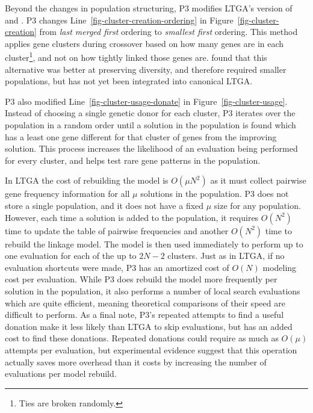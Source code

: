 \documentclass[twoside]{article}
\begin{document}
Beyond the changes in population structuring, P3 modifies
LTGA's version of  and .
P3 changes Line~\ref{fig-cluster-creation-ordering} in Figure~\ref{fig-cluster-creation}
from \emph{last merged first} ordering to \emph{smallest first} ordering.
This method applies gene clusters during crossover based on how many genes
are in each cluster\footnote{Ties are broken randomly.}, and not on how tightly linked those genes are.
\cite{goldman:2012:ltga} found that this alternative was better at preserving
diversity, and therefore required smaller populations, but has not yet been integrated into
canonical LTGA.

P3 also modified Line~\ref{fig-cluster-usage-donate} in Figure~\ref{fig-cluster-usage}.
Instead of choosing a single genetic donor for each cluster, P3 iterates over the
population in a random order until a solution in the population is found which
has a least one gene different for that cluster of genes from the improving solution.
This process increases the likelihood of an evaluation being performed for every cluster,
and helps test rare gene patterns in the population.

In LTGA the cost of rebuilding the model is $O(\mu N^2)$ as it must collect pairwise
gene frequency information for all $\mu$ solutions in the population. P3 does not store
a single population, and it does not have a fixed $\mu$ size for any population. However,
each time a solution is added to the population, it requires $O(N^2)$ time to update
the table of pairwise frequencies and another $O(N^2)$ time to rebuild the linkage model.
The model is then used immediately to perform up to one evaluation for each of the up
to $2N-2$ clusters. Just as in LTGA, if no evaluation shortcuts were made, P3
has an amortized cost of $O(N)$ modeling cost per evaluation. While P3 does
rebuild the model more frequently per solution in the population, it also performs
a number of local search evaluations which are quite efficient, meaning theoretical
comparisons of their speed are difficult to perform. As a final note, P3's repeated
attempts to find a useful donation make it less likely than LTGA to skip evaluations,
but has an added cost to find these donations. Repeated donations could require as much
as $O(\mu)$ attempts per evaluation, but experimental evidence suggest that this
operation actually saves more overhead than it costs by increasing the number of evaluations
per model rebuild.
\end{document}
